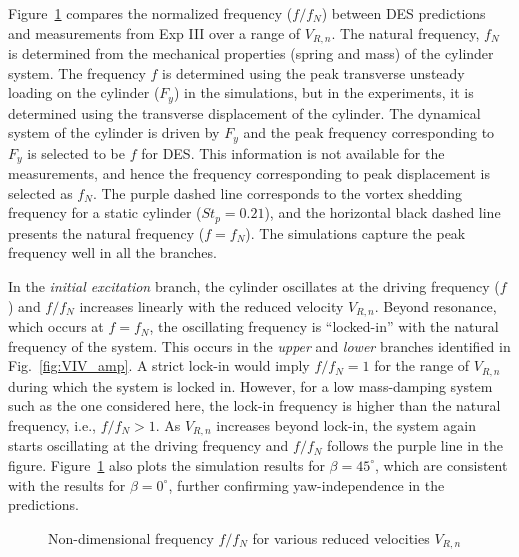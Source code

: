 Figure~\ref{fig:VIV_freq} compares the normalized frequency ($f/f_N$) between
DES predictions and measurements from Exp III over a range of $V_{R,n}$. The
natural frequency, $f_N$ is determined from the mechanical properties (spring
and mass) of the cylinder system. The frequency $f$ is determined using the
peak transverse unsteady loading on the cylinder ($F_y$) in the simulations,
but in the experiments, it is determined using the transverse displacement of
the cylinder. The dynamical system of the cylinder is driven by $F_y$ and the
peak frequency corresponding to $F_y$ is selected to be $f$ for DES. This
information is not available for the measurements, and hence the frequency
corresponding to peak displacement is selected as $f_N$. The purple dashed line
corresponds to the vortex shedding frequency for a static cylinder
($St_p=0.21$), and the horizontal black dashed line presents the natural
frequency ($f=f_N$). The simulations capture the peak frequency well in all the
branches.

In the {\em initial excitation} branch, the cylinder oscillates at the driving
frequency ($f$) and $f/f_N$ increases linearly with the reduced velocity
$V_{R,n}$. Beyond resonance, which occurs at $f=f_N$, the oscillating frequency
is ``locked-in'' with the natural frequency of the system. This occurs in the
{\em upper} and {\em lower} branches identified in Fig.~\ref{fig:VIV_amp}. A
strict lock-in would imply $f/f_N=1$ for the range of $V_{R,n}$ during which
the system is locked in. However, for a low mass-damping system such as the one
considered here, the lock-in frequency is higher than the natural frequency,
i.e., $f/f_N>1$. As $V_{R,n}$ increases beyond lock-in, the system again starts
oscillating at the driving frequency and $f/f_N$ follows the purple line in the
figure. Figure~\ref{fig:VIV_freq} also plots the simulation results for
$\beta=45^\circ$, which are consistent with the results for $\beta=0^\circ$,
further confirming yaw-independence in the predictions.
%
\begin{figure}[htb!]
  \caption{Non-dimensional frequency $f/f_N$ for various reduced velocities
    $V_{R,n}$}
  \label{fig:VIV_freq}
\end{figure}

